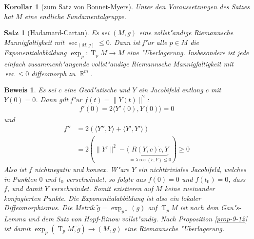 \documentclass[paper=A4, twoside, chapterprefix=true, bibliography=totoc, headsepline]{scrbook}
\DeclareMathOperator{\R}{\mathbb{R}}
\DeclareMathOperator{\T}{T}         %
\theoremstyle{plain}
\newtheorem{Satz}[Dfn]{Satz}
\theoremstyle{nonumberplain}
\newtheorem{kor}{Korollar}
\newtheorem{bew}{Beweis}
\theoremstyle{empty}
\theoremstyle{break}
\begin{document}
\begin{kor}[zum Satz von Bonnet-Myers]
  Unter den Voraussetzungen des Satzes hat $M$ eine endliche Fundamentalgruppe.
\end{kor}

\begin{Satz}[Hadamard-Cartan]
  Es sei $(M,g)$ eine vollst"andige Riemannsche Mannigfaltigkeit mit $\sec_{(M,g)} \le 0$. Dann ist f"ur alle $p \in M$ die Exponentialabbildung $\exp_p: \T_pM \to M$ eine "Uberlagerung.
  Insbesondere ist jede einfach zusammenh"angende vollst"andige Riemannsche Mannigfaltigkeit mit $\sec \le 0$ diffeomorph zu $\R^m$.
\end{Satz}

\begin{bew}
  Es sei $c$ eine Geod"atische und $Y$ ein Jacobifeld entlang $c$ mit $Y(0) = 0$. Dann gilt f"ur $f(t) = \|Y(t)\|^2$:
  \begin{align*}
    f'(0) = 2 \langle Y'(0), Y(0) \rangle = 0
  \end{align*}
  und
  \begin{align*}
    f'' &= 2 (\langle Y'', Y \rangle + \langle Y', Y' \rangle)\\
    &= 2 (\|Y'\|^2 - \langle \underbrace{R(Y, \dot c) \dot c, Y}_{=\lambda\sec(\dot c, Y) \le 0}) \ge 0
  \end{align*}
  Also ist $f$ nichtnegativ und konvex. W"are $Y$ ein nichttriviales Jacobifeld, welches in Punkten $0$ und $t_0$ verschwindet, so folgte aus $f(0) = 0$ und $f(t_0) = 0$, dass $f$, und damit $Y$ verschwindet.
  Somit existieren auf $M$ keine zueinander konjugierten Punkte.
  Die Exponentialabbildung ist also ein lokaler Diffeomorphismus.
  Die Metrik $\tilde g = \exp_{p*}(g)$ auf $\T_pM$ ist nach dem Gau"s-Lemma und dem Satz von Hopf-Rinow vollst"andig.
  Nach Proposition \ref{prop-9-12} ist damit $\exp_p(\T_pM, \tilde g) \to (M,g)$ eine Riemannsche "Uberlagerung.
\end{bew}
\end{document}
